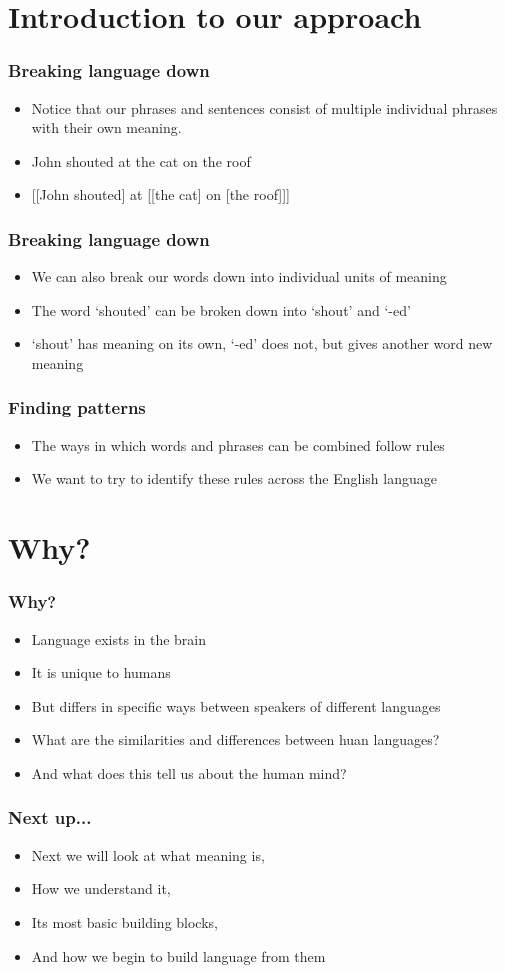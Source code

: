 \documentclass{beamer}
\begin{document}
\section{Introduction to our approach}

\begin{frame}
\frametitle{Breaking language down}
\begin{itemize}
\item Notice that our phrases and sentences consist of multiple individual phrases with their own meaning.
\item John shouted at the cat on the roof
\item {[[John shouted] at [[the cat] on [the roof]]]}
\end{itemize}
\end{frame}

\begin{frame}
\frametitle{Breaking language down}
\begin{itemize}
\item We can also break our words down into individual units of meaning
\item The word `shouted' can be broken down into `shout' and `-ed'
\item `shout' has meaning on its own, `-ed' does not, but gives another word new meaning
\end{itemize}
\end{frame}


\begin{frame}
\frametitle{Finding patterns}
\begin{itemize}
\item The ways in which words and phrases can be combined follow rules
\item We want to try to identify these rules across the English language

\end{itemize}

\end{frame}

\section{Why?}
\begin{frame}
\frametitle{Why?}
\begin{itemize}
\item Language exists in the brain
\item It is unique to humans
\item But differs in specific ways between speakers of different languages
\item What are the similarities and differences between huan languages?
\item And what does this tell us about the human mind?

\end{itemize}

\end{frame}

\begin{frame}
	\frametitle{Next up...}
	\begin{itemize}
	\item Next we will look at what meaning is,
	\item How we understand it,
	\item Its most basic building blocks,
	\item And how we begin to build language from them

	\end{itemize}
\end{frame}
\end{document}
